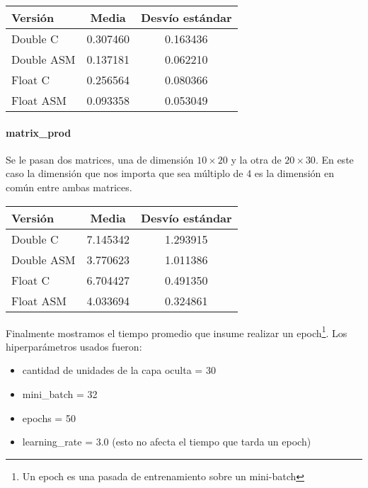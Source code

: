 \begin{center}
    \begin{tabular}{| l | c | c |}
                \hline
    Versión & Media & Desvío estándar \\
                \hline
    Double C & 0.307460 & 0.163436 \\
    Double ASM & 0.137181 & 0.062210 \\
    Float C & 0.256564 & 0.080366 \\
    Float ASM  & 0.093358 & 0.053049 \\
                \hline
            
        \end{tabular}
\end{center}

\paragraph{matrix\_prod}

Se le pasan dos matrices, una de dimensión $10\times 20$ y la otra de $20\times 30$. En este caso la dimensión que nos importa que sea múltiplo de 4 es la dimensión en común entre ambas matrices.

\begin{center}
    \begin{tabular}{| l | c | c |}
                \hline
    Versión & Media & Desvío estándar \\
                \hline
    Double C & 7.145342 & 1.293915 \\
    Double ASM & 3.770623 & 1.011386 \\
    Float C & 6.704427 & 0.491350 \\
    Float ASM  & 4.033694 & 0.324861 \\
                \hline
            
        \end{tabular}
\end{center}

Finalmente mostramos el tiempo promedio que insume realizar un epoch\footnote{Un epoch es una pasada de entrenamiento sobre un mini-batch}. Los hiperparámetros usados fueron:
\begin{itemize}
    \item cantidad de unidades de la capa oculta = 30
    \item mini\_batch = 32
    \item epochs = 50
    \item learning\_rate = 3.0 (esto no afecta el tiempo que tarda un epoch)
\end{itemize}

